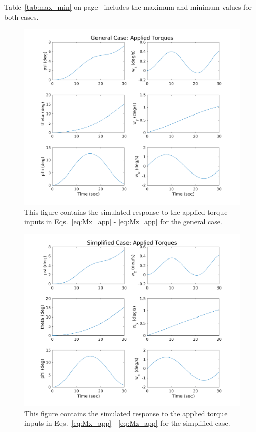 \documentclass{article}
\begin{document}
Table~\ref{tab:max_min} on page~\pageref{tab:max_min} includes the maximum and minimum values for both cases.

\begin{figure}[H]
  \includegraphics[width=\linewidth]{general_case.png}
  \caption{This figure contains the simulated response to the applied torque inputs in Eqs.~\ref{eq:Mx_app} - \ref{eq:Mz_app} for the general case.}
  \label{fig:gen_case}
\end{figure}

\begin{figure}[H]
  \includegraphics[width=\linewidth]{simplified_case.png}
  \caption{This figure contains the simulated response to the applied torque inputs in Eqs.~\ref{eq:Mx_app} - \ref{eq:Mz_app} for the simplified case.}
  \label{fig:sim_case}
\end{figure}
\end{document}
